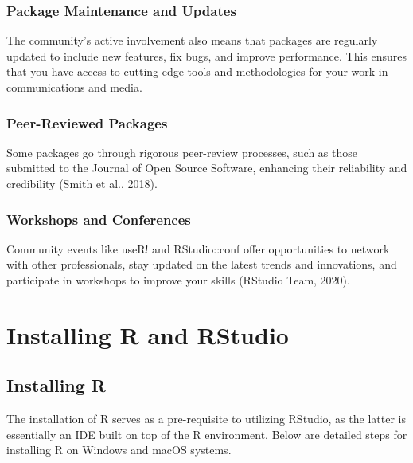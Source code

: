 \documentclass[
  b5paper]{book}
\begin{document}
\hypertarget{package-maintenance-and-updates}{%
\subsubsection*{Package Maintenance and Updates}\label{package-maintenance-and-updates}}

The community's active involvement also means that packages are regularly updated to include new features, fix bugs, and improve performance. This ensures that you have access to cutting-edge tools and methodologies for your work in communications and media.

\hypertarget{peer-reviewed-packages}{%
\subsubsection*{Peer-Reviewed Packages}\label{peer-reviewed-packages}}

Some packages go through rigorous peer-review processes, such as those submitted to the Journal of Open Source Software, enhancing their reliability and credibility (Smith et al., 2018).

\hypertarget{workshops-and-conferences}{%
\subsubsection*{Workshops and Conferences}\label{workshops-and-conferences}}

Community events like useR! and RStudio::conf offer opportunities to network with other professionals, stay updated on the latest trends and innovations, and participate in workshops to improve your skills (RStudio Team, 2020).

\hypertarget{installing-r-and-rstudio}{%
\section{Installing R and RStudio}\label{installing-r-and-rstudio}}

\hypertarget{installing-r}{%
\subsection*{Installing R}\label{installing-r}}

The installation of R serves as a pre-requisite to utilizing RStudio, as the latter is essentially an IDE built on top of the R environment. Below are detailed steps for installing R on Windows and macOS systems.
\end{document}
